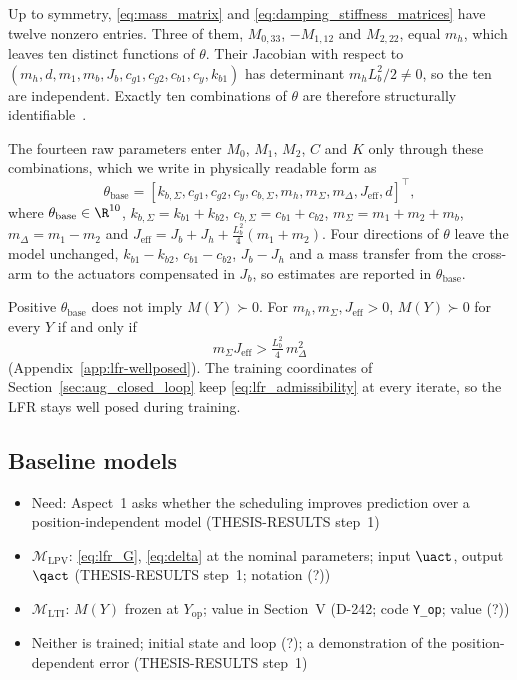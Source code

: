 Up to symmetry, \eqref{eq:mass_matrix} and \eqref{eq:damping_stiffness_matrices}
have twelve nonzero entries.
Three of them, $M_{0,33}$, $-M_{1,12}$ and $M_{2,22}$, equal $m_h$, which
leaves ten distinct functions of $\theta$.
Their Jacobian with respect to
$(m_h,d,m_1,m_b,J_b,c_{g1},c_{g2},c_{b1},c_y,k_{b1})$ has determinant
$m_hL_b^2/2\neq0$, so the ten are independent.
Exactly ten combinations of $\theta$ are therefore structurally
identifiable~\cite[Def.~7]{ovchinnikov2021computing}.

The fourteen raw parameters enter $M_0$, $M_1$, $M_2$, $C$ and $K$ only
through these combinations, which we write in physically readable form as
\begin{equation}
  \theta_{\mathrm{base}}=[k_{b,\Sigma},c_{g1},c_{g2},c_y,c_{b,\Sigma},
  m_h,m_\Sigma,m_\Delta,J_{\mathrm{eff}},d]^\top,
  \label{eq:phi}
\end{equation}
where $\theta_{\mathrm{base}}\in\R^{10}$, $k_{b,\Sigma}=k_{b1}+k_{b2}$,
$c_{b,\Sigma}=c_{b1}+c_{b2}$, $m_\Sigma=m_1+m_2+m_b$, $m_\Delta=m_1-m_2$ and
$J_{\mathrm{eff}}=J_b+J_h+\tfrac{L_b^2}{4}(m_1+m_2)$.
Four directions of $\theta$ leave the model unchanged, $k_{b1}-k_{b2}$,
$c_{b1}-c_{b2}$, $J_b-J_h$ and a mass transfer from the cross-arm to the
actuators compensated in $J_b$, so estimates are reported in
$\theta_{\mathrm{base}}$.

Positive $\theta_{\mathrm{base}}$ does not imply $M(Y)\succ0$.
For $m_h,m_\Sigma,J_{\mathrm{eff}}>0$, $M(Y)\succ0$ for every $Y$ if and only
if
\begin{equation}
  m_\Sigma J_{\mathrm{eff}}>\tfrac{L_b^2}{4}\,m_\Delta^2
  \label{eq:lfr_admissibility}
\end{equation}
(Appendix~\ref{app:lfr-wellposed}).
The training coordinates of Section~\ref{sec:aug_closed_loop} keep
\eqref{eq:lfr_admissibility} at every iterate, so the LFR stays well posed
during training.

\subsection{Baseline models}\label{sec:baseline_models}
\ifdraft
\begin{itemize}
\item Need: Aspect~1 asks whether the scheduling improves prediction over a position-independent model (THESIS-RESULTS step~1)
\item $\mathcal M_{\mathrm{LPV}}$: \eqref{eq:lfr_G}, \eqref{eq:delta} at the nominal parameters; input $\uact$, output $\qact$ (THESIS-RESULTS step~1; notation (?))
\item $\mathcal M_{\mathrm{LTI}}$: $M(Y)$ frozen at $Y_{\mathrm{op}}$; value in Section~V (D-242; code \texttt{Y\_op}; value (?))
\item Neither is trained; initial state and loop (?); a demonstration of the position-dependent error (THESIS-RESULTS step~1)
\end{itemize}
\fi

